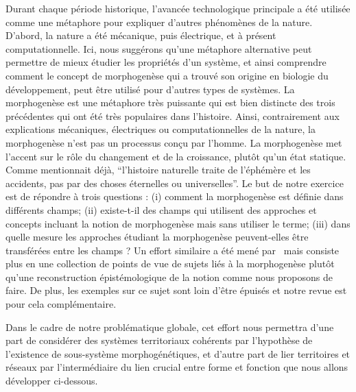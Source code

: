 {Durant chaque période historique, l'avancée technologique principale a été utilisée comme une métaphore pour expliquer d'autres phénomènes de la nature. D'abord, la nature a été mécanique, puis électrique, et à présent computationnelle. Ici, nous suggérons qu'une métaphore alternative peut permettre de mieux étudier les propriétés d'un système, et ainsi comprendre comment le concept de morphogenèse qui a trouvé son origine en biologie du développement, peut être utilisé pour d'autres types de systèmes. La morphogenèse est une métaphore très puissante qui est bien distincte des trois précédentes qui ont été très populaires dans l'histoire. Ainsi, contrairement aux explications mécaniques, électriques ou computationnelles de la nature, la morphogenèse n'est pas un processus conçu par l'homme. La morphogenèse met l'accent sur le rôle du changement et de la croissance, plutôt qu'un état statique. Comme \cite{thompson1942growth} mentionnait déjà, ``l'histoire naturelle traite de l'éphémère et les accidents, pas par des choses éternelles ou universelles''. Le but de notre exercice est de répondre à trois questions : (i) comment la morphogenèse est définie dans différents champs; (ii) existe-t-il des champs qui utilisent des approches et concepts incluant la notion de morphogenèse mais sans utiliser le terme; (iii) dans quelle mesure les approches étudiant la morphogenèse peuvent-elles être transférées entre les champs ? Un effort similaire a été mené par~\cite{bourgine2010morphogenesis} mais consiste plus en une collection de points de vue de sujets liés à la morphogenèse plutôt qu'une reconstruction épistémologique de la notion comme nous proposons de faire. De plus, les exemples sur ce sujet sont loin d'être épuisés et notre revue est pour cela complémentaire.
}

Dans le cadre de notre problématique globale, cet effort nous permettra d'une part de considérer des systèmes territoriaux cohérents par l'hypothèse de l'existence de sous-système morphogénétiques, et d'autre part de lier territoires et réseaux par l'intermédiaire du lien crucial entre forme et fonction que nous allons développer ci-dessous.






